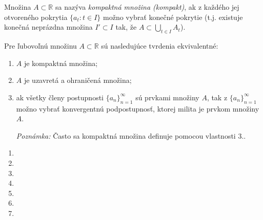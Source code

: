 Množina $A \subset \mathbb{R}$ sa nazýva \textit{kompaktná množina (kompakt)}, ak z každého jej otvoreného pokrytia $\{a_t: t \in I\}$ možno vybrať konečné pokrytie (t.j. existuje konečná neprázdna množina $I' \subset I$ tak, že $A \subset \bigcup_{t \in I} A_t$).

\begin{veta}
Pre ľubovoľnú množinu $A \subset \mathbb{R}$ sú nasledujúce tvrdenia ekvivalentné:
\begin{enumerate}
\item $A$ je kompaktná množina;
\item $A$ je uzavretá a ohraničená množina;
\item ak všetky členy postupnosti ${\{a_n\}}_{n=1}^\infty$ sú prvkami množiny $A$, tak z ${\{a_n\}}_{n=1}^\infty$ možno vybrať konvergentnú podpostupnosť, ktorej milita je prvkom množiny $A$.

\textit{Poznámka:}
Často sa kompaktná množina definuje pomocou vlastnosti $3.$.
\end{enumerate}
\end{veta}

\begin{enumerate}[resume]
	\item {}
	\item {}
	\item {}
	\item {}
	\item {}
	\item {}
	\item {}
\end{enumerate}

